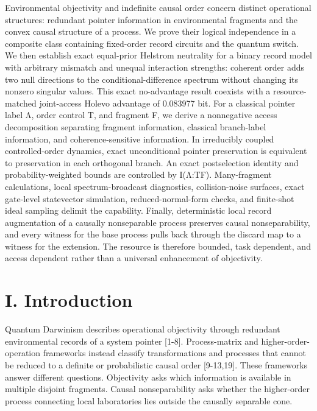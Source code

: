 \documentclass[
]{article}
\begin{document}
Environmental objectivity and indefinite causal order concern distinct
operational structures: redundant pointer information in environmental
fragments and the convex causal structure of a process. We prove their
logical independence in a composite class containing fixed-order record
circuits and the quantum switch. We then establish exact equal-prior
Helstrom neutrality for a binary record model with arbitrary mismatch
and unequal interaction strengths: coherent order adds two null
directions to the conditional-difference spectrum without changing its
nonzero singular values. This exact no-advantage result coexists with a
resource-matched joint-access Holevo advantage of 0.083977 bit. For a
classical pointer label Λ, order control T, and fragment F, we derive a
nonnegative access decomposition separating fragment information,
classical branch-label information, and coherence-sensitive information.
In irreducibly coupled controlled-order dynamics, exact unconditional
pointer preservation is equivalent to preservation in each orthogonal
branch. An exact postselection identity and probability-weighted bounds
are controlled by I(Λ:T\textbar F). Many-fragment calculations, local
spectrum-broadcast diagnostics, collision-noise surfaces, exact
gate-level statevector simulation, reduced-normal-form checks, and
finite-shot ideal sampling delimit the capability. Finally,
deterministic local record augmentation of a causally nonseparable
process preserves causal nonseparability, and every witness for the base
process pulls back through the discard map to a witness for the
extension. The resource is therefore bounded, task dependent, and access
dependent rather than a universal enhancement of objectivity.

\section{I. Introduction}\label{i.-introduction}

Quantum Darwinism describes operational objectivity through redundant
environmental records of a system pointer {[}1-8{]}. Process-matrix and
higher-order-operation frameworks instead classify transformations and
processes that cannot be reduced to a definite or probabilistic causal
order {[}9-13,19{]}. These frameworks answer different questions.
Objectivity asks which information is available in multiple disjoint
fragments. Causal nonseparability asks whether the higher-order process
connecting local laboratories lies outside the causally separable cone.
\end{document}
